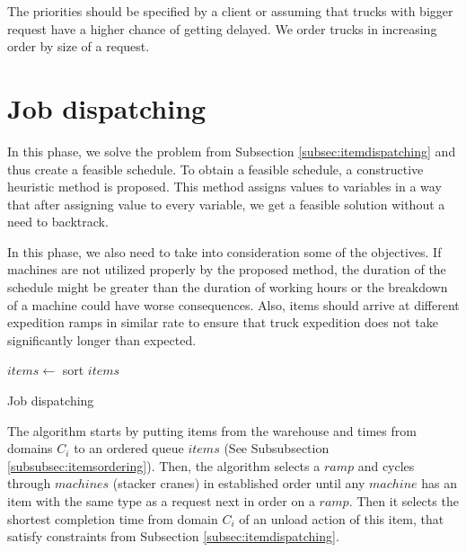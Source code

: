 \documentclass{ctuthesis}
\begin{document}
The priorities should be specified by a client or assuming that trucks with bigger request have a higher chance of getting delayed. We order trucks in increasing order by size of a request.

\section{Job dispatching}
\label{sec:jobdispatching}

In this phase, we solve the problem from Subsection \ref{subsec:itemdispatching} and thus create a feasible schedule.
To obtain a feasible schedule, a constructive heuristic method is proposed. This method assigns values to variables in a way that after assigning value to every variable, we get a feasible solution without a need to backtrack.

In this phase, we also need to take into consideration some of the objectives. If machines are not utilized properly by the proposed method, the duration of the schedule might be greater than the duration of working hours or the breakdown of a machine could have worse consequences. Also, items should arrive at different expedition ramps in similar rate to ensure that truck expedition does not take significantly longer than expected.
 
\begin{algorithm}[H]
\SetAlgoLined
{}
  $items \leftarrow$ sort $items$\;
\caption{Job dispatching}
\end{algorithm}

The algorithm starts by putting items from the warehouse and times from domains $C_i$ to an ordered queue $items$ (See Subsubsection \ref{subsubsec:itemsordering}). Then, the algorithm selects a $ramp$ and cycles through $machines$ (stacker cranes) in established order until any $machine$ has an item with the same type as a request next in order on a $ramp$. Then it selects the shortest completion time from domain $C_i$ of an unload action of this item, that satisfy constraints from Subsection \ref{subsec:itemdispatching}. 
\end{document}
